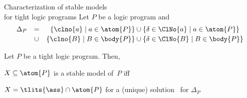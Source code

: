 \begin{frame}{Characterization of stable models\\\normalsize
  for \alert<3>{tight} logic programs}
\bigskip
Let $P$ be a logic program and
\[
\begin{array}{lcr@{}c@{}l}
\Delta_P
& = &
\{\clno{a} \mid a\in\atom{P}\}
& {} \cup {} &
\{\delta\in\ClNo{a} \mid a\in\atom{P}\}
\\[2pt]
& \cup &
\{\clno{B} \mid B\in\body{P}\}
& {} \cup {} &
\{\delta\in\ClNo{B}\mid B\in\body{P}\}
\end{array}
\]
\bigskip
\pause
\begin{theorem}
Let $P$ be a \alert{tight} logic program. Then,

\qquad $X\subseteq\atom{P}$ is a stable model of~$P$ \alert{iff}

\qquad $X=\tlits{\ass}\cap\atom{P}$ for a (unique) solution \ass\ for $\Delta_P$
\end{theorem}
\end{frame}

